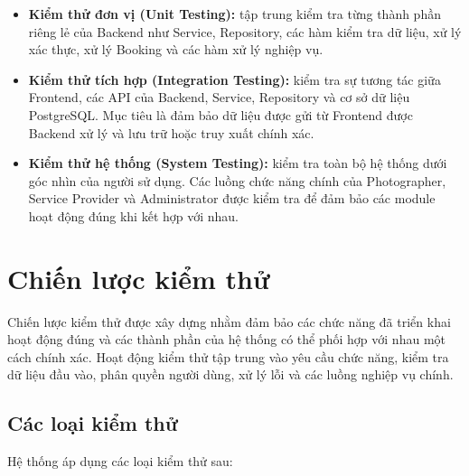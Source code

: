 \begin{itemize}
	\item \textbf{Kiểm thử đơn vị (Unit Testing):} tập trung kiểm tra từng thành phần riêng lẻ của Backend như Service, Repository, các hàm kiểm tra dữ liệu, xử lý xác thực, xử lý Booking và các hàm xử lý nghiệp vụ.
	
	\item \textbf{Kiểm thử tích hợp (Integration Testing):} kiểm tra sự tương tác giữa Frontend, các API của Backend, Service, Repository và cơ sở dữ liệu PostgreSQL. Mục tiêu là đảm bảo dữ liệu được gửi từ Frontend được Backend xử lý và lưu trữ hoặc truy xuất chính xác.
	
	\item \textbf{Kiểm thử hệ thống (System Testing):} kiểm tra toàn bộ hệ thống dưới góc nhìn của người sử dụng. Các luồng chức năng chính của Photographer, Service Provider và Administrator được kiểm tra để đảm bảo các module hoạt động đúng khi kết hợp với nhau.
\end{itemize}



\section{Chiến lược kiểm thử}

Chiến lược kiểm thử được xây dựng nhằm đảm bảo các chức năng đã triển khai hoạt động đúng và các thành phần của hệ thống có thể phối hợp với nhau một cách chính xác. Hoạt động kiểm thử tập trung vào yêu cầu chức năng, kiểm tra dữ liệu đầu vào, phân quyền người dùng, xử lý lỗi và các luồng nghiệp vụ chính.

\subsection{Các loại kiểm thử}

Hệ thống áp dụng các loại kiểm thử sau:

